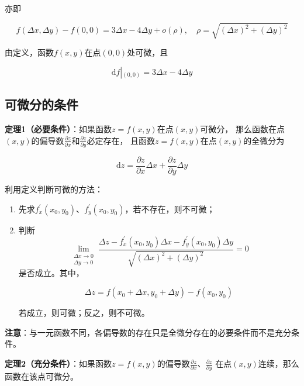 \documentclass[12pt, a4paper]{article}
\numberwithin{equation}{section}
\newcommand{\rmd}{\mathrm{d}}
\newcommand{\pderiv}[2]{\frac{\partial #1}{\partial #2}}
\begin{document}
    亦即

    $$
        f\left(\Delta x,\Delta y\right) - f\left(0,0\right) = 3 \Delta x-4 \Delta y+o(\rho),\quad
        \rho = \sqrt{\left(\Delta x\right)^2+\left(\Delta y\right)^2}
    $$

    由定义，函数\(f\left(x,y\right)\)在点\(\left(0, 0\right)\)处可微，且

    $$
        \rmd f\left|_{\left(0,0\right)}\right. = 3 \Delta x-4 \Delta y
    $$

\subsection{可微分的条件}

    \textbf{定理1（必要条件）}：如果函数\(z=f\left(x,y\right)\)在点\(\left(x, y\right)\)可微分，
    那么函数在点\(\left(x, y\right)\)的偏导数\(\pderiv{z}{x}\)和\(\pderiv{z}{y}\)必定存在，
    且函数\(z=f\left(x,y\right)\)在点\(\left(x, y\right)\)的全微分为

    \begin{equation}
        \mathrm{d} z=\frac{\partial z}{\partial x} \Delta x+\frac{\partial z}{\partial y} \Delta y
    \end{equation}

    利用定义判断可微的方法：

    \begin{enumerate}
        \item 先求\(f^{\prime}_x\left(x_0,y_0\right)\)、\(f^{\prime}_y\left(x_0,y_0\right)\)，若不存在，则不可微；
        \item 判断
            $$
                \lim _{\substack{\Delta x \rightarrow 0 \\ \Delta y \rightarrow 0}}
                \frac{\Delta z-f_x^{\prime}\left(x_0, y_0\right) \Delta x-f_y^{\prime}\left(x_0, y_0\right) \Delta y}
                {\sqrt{(\Delta x)^2+(\Delta y)^2}}=0
            $$
            是否成立。其中，

            $$
                \Delta z =f\left(x_0+\Delta x, y_0+\Delta y\right)-f\left(x_0, y_0\right)
            $$
            
            若成立，则可微；反之，则不可微。
    \end{enumerate}

    \textbf{注意}：与一元函数不同，各偏导数的存在只是全微分存在的必要条件而不是充分条件。

    \textbf{定理2（充分条件）}：如果函数\(z=f\left(x,y\right)\)的偏导数\(\pderiv{z}{x}\)、\(\pderiv{z}{y}\)
    在点\(\left(x, y\right)\)连续，那么函数在该点可微分。
\end{document}
